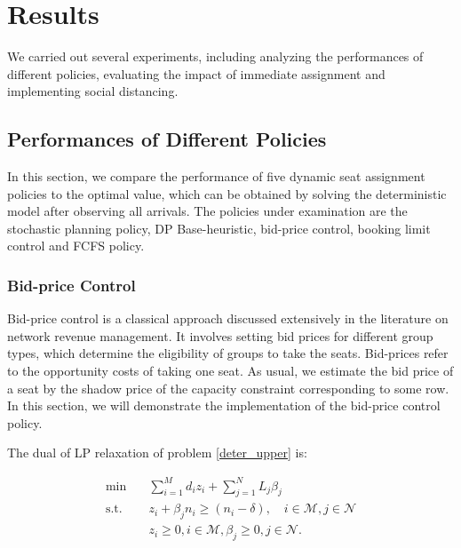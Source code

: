 \section{Results}
We carried out several experiments, including analyzing the performances of different policies, evaluating the impact of immediate assignment and implementing social distancing.


\subsection{Performances of Different Policies}
In this section, we compare the performance of five dynamic seat assignment policies to the optimal value, which can be obtained by solving the deterministic model after observing all arrivals. The policies under examination are the stochastic planning policy, DP Base-heuristic, bid-price control, booking limit control and FCFS policy. 


\subsubsection*{Bid-price Control}
Bid-price control is a classical approach discussed extensively in the literature on network revenue management. It involves setting bid prices for different group types, which determine the eligibility of groups to take the seats. Bid-prices refer to the opportunity costs of taking one seat. As usual, we estimate the bid price of a seat by the shadow price of the capacity constraint corresponding to some row. In this section, we will demonstrate the implementation of the bid-price control policy. 

The dual of LP relaxation of problem \eqref{deter_upper} is:

\begin{equation}\label{bid-price_dual}
  \begin{aligned}
  \min \quad & \sum_{i=1}^{M} d_i z_i + \sum_{j= 1}^{N} L_j \beta_{j} \\
  \text {s.t.} \quad & z_{i} + \beta_j n_i \geq (n_i-\delta), \quad i \in \mathcal{M}, j \in \mathcal{N} \\
  & z_{i} \geq 0, i \in \mathcal{M}, \beta_{j} \geq 0, j \in \mathcal{N}.
  \end{aligned}
\end{equation}

